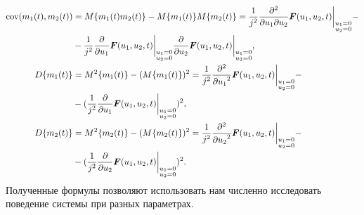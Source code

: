 \begin{equation*}
	\begin{split}
		\textnormal{cov}(m_{1}(t),m_{2}(t)) &= M\{m_{1}(t)m_{2}(t)\} - M\{m_{1}(t)\}M\{m_{2}(t)\} = \frac{1}{j^{2}}\frac{{\partial}^{2}}{{\partial u_{1}}{\partial u_{2}}}\boldsymbol{F}(u_{1},u_{2},t) \bigg\rvert_{\substack{u_{1} = 0 \\ u_{2} = 0}} - \\ &- \frac{1}{j^{2}} \frac{{\partial}}{{\partial u_{1}}} \boldsymbol{F}(u_{1},u_{2},t) \bigg\rvert_{\substack{u_{1} = 0 \\ u_{2} = 0}} \frac{{\partial}}{{\partial u_{2}}} \boldsymbol{F}(u_{1},u_{2},t) \bigg\rvert_{\substack{u_{1} = 0 \\ u_{2} = 0}},
		\\
		D\{m_{1}(t)\} &= M^{2}\{m_{1}(t)\} - (M\{m_{1}(t)\})^{2} = \frac{1}{j^{2}}\frac{{\partial}^{2}}{{\partial u_{1}}^{2}}\boldsymbol{F}(u_{1},u_{2},t) \bigg\rvert_{\substack{u_{1} = 0 \\ u_{2} = 0}}  - \\ &- (\frac{1}{j^{2}} \frac{{\partial}}{{\partial u_{1}}} \boldsymbol{F}(u_{1},u_{2},t) \bigg\rvert_{\substack{u_{1} = 0 \\ u_{2} = 0}})^{2},
		\\
		D\{m_{2}(t)\} &= M^{2}\{m_{2}(t)\} - (M\{m_{2}(t)\})^{2} = \frac{1}{j^{2}}\frac{{\partial}^{2}}{{\partial u_{2}}^{2}}\boldsymbol{F}(u_{1},u_{2},t) \bigg\rvert_{\substack{u_{1} = 0 \\ u_{2} = 0}}  - \\ &- (\frac{1}{j^{2}} \frac{{\partial}}{{\partial u_{2}}} \boldsymbol{F}(u_{1},u_{2},t) \bigg\rvert_{\substack{u_{1} = 0 \\ u_{2} = 0}})^{2}.
	\end{split}
\end{equation*}
Полученные формулы позволяют использовать нам численно исследовать поведение системы при разных параметрах.
\clearpage